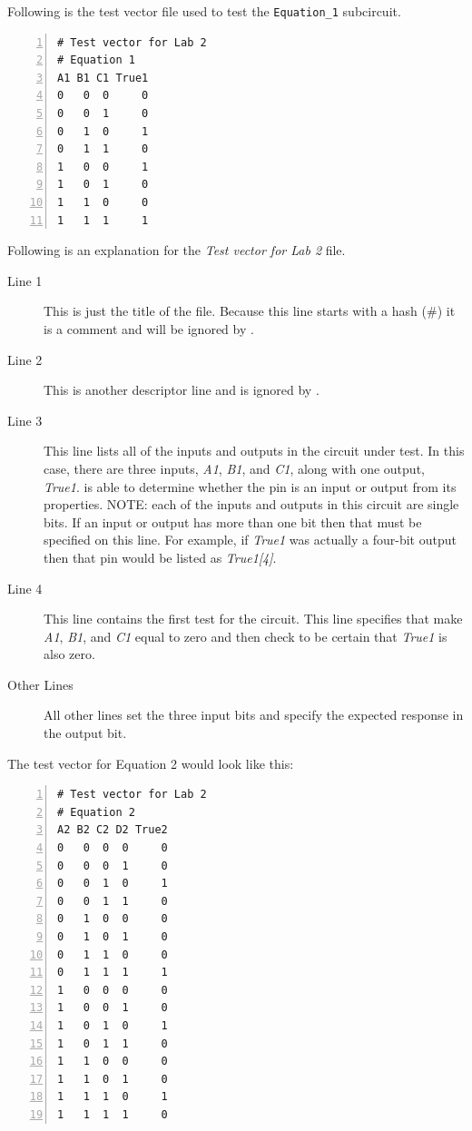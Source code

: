 Following is the test vector file used to test the \lstinline[columns=fixed]|Equation_1| subcircuit.

\begin{Verbatim}[frame=lines,
numbers=left,
xleftmargin=10mm,
xrightmargin=10mm]
# Test vector for Lab 2
# Equation 1
A1 B1 C1 True1
0   0  0     0
0   0  1     0
0   1  0     1
0   1  1     0
1   0  0     1
1   0  1     0
1   1  0     0
1   1  1     1
\end{Verbatim}

Following is an explanation for the \textit{Test vector for Lab 2} file.

\begin{description}
	\item[Line 1] This is just the title of the file. Because this line starts with a hash (\#) it is a comment and will be ignored by \LE.
	\item[Line 2] This is another descriptor line and is ignored by \LE.
	\item[Line 3] This line lists all of the inputs and outputs in the circuit under test. In this case, there are three inputs, \textit{A1}, \textit{B1}, and \textit{C1}, along with one output, \textit{True1}. \LE is able to determine whether the pin is an input or output from its properties. NOTE: each of the inputs and outputs in this circuit are single bits. If an input or output has more than one bit then that must be specified on this line. For example, if \textit{True1} was actually a four-bit output then that pin would be listed as \textit{True1[4]}.
	\item[Line 4] This line contains the first test for the circuit. This line specifies that \LE make \textit{A1}, \textit{B1}, and \textit{C1} equal to zero and then check to be certain that \textit{True1} is also zero.
	\item[Other Lines] All other lines set the three input bits and specify the expected response in the output bit.
\end{description}

The test vector for Equation 2 would look like this:

\begin{Verbatim}[frame=lines,
numbers=left,
xleftmargin=10mm,
xrightmargin=10mm]
# Test vector for Lab 2
# Equation 2
A2 B2 C2 D2 True2
0   0  0  0     0
0   0  0  1     0
0   0  1  0     1
0   0  1  1     0
0   1  0  0     0
0   1  0  1     0
0   1  1  0     0
0   1  1  1     1
1   0  0  0     0
1   0  0  1     0
1   0  1  0     1
1   0  1  1     0
1   1  0  0     0
1   1  0  1     0
1   1  1  0     1
1   1  1  1     0
\end{Verbatim}

